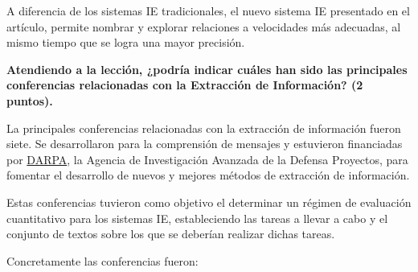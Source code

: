 \documentclass[11pt]{exam}
\begin{document}
\begin{questions}
A diferencia de los sistemas IE tradicionales, el nuevo sistema IE presentado en el artículo, permite nombrar y explorar relaciones a velocidades más adecuadas, al mismo tiempo que se logra una mayor precisión.

{\bf \question Atendiendo a la lección, ¿podría indicar cuáles han sido las principales conferencias relacionadas con la Extracción de Información? (2 puntos).}

La principales conferencias relacionadas con la extracción de información fueron siete. Se desarrollaron para la comprensión de mensajes y estuvieron financiadas por \href{https://es.qwe.wiki/wiki/DARPA}{DARPA}, la Agencia de Investigación Avanzada de la Defensa Proyectos, para fomentar el desarrollo de nuevos y mejores métodos de extracción de información. 

Estas conferencias tuvieron como objetivo el determinar un régimen de evaluación cuantitativo para los sistemas IE, estableciendo las tareas a llevar a cabo y el conjunto de textos sobre los que se deberían realizar dichas tareas.

Concretamente las conferencias fueron:


\end{questions}
\end{document}
